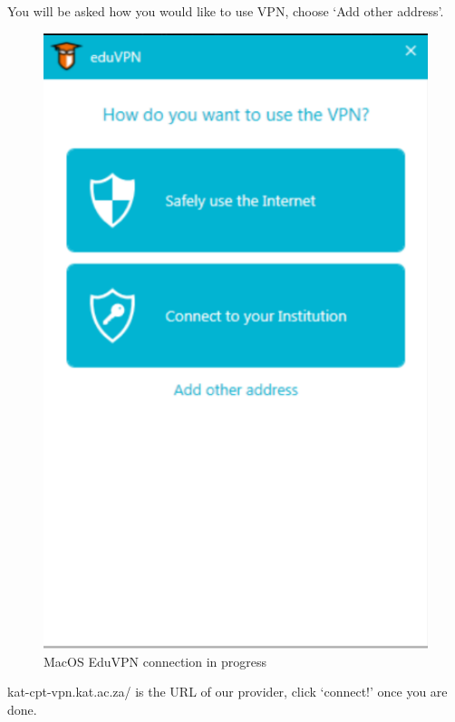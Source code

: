 You will be asked how you would like to use VPN, choose ‘Add other address’.
\begin{figure}[!thb]
	\centering
	\includegraphics[scale=0.8]{Chapters/images/image110.png}
	
	\caption{MacOS EduVPN connection in progress }
	\label{fig:image110}
\end{figure}
 kat-cpt-vpn.kat.ac.za/ is the URL of our provider, click ‘connect!’ once you are done. 
